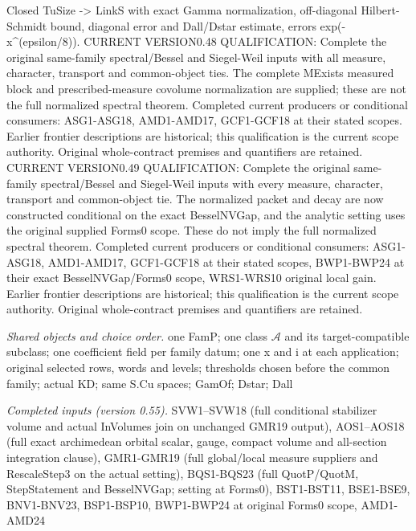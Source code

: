 \documentclass[11pt,a4paper]{article}
\numberwithin{equation}{section}
\theoremstyle{remark}\newtheorem{remark}[theorem]{Remark}
\begin{document}
Closed TuSize -> LinkS with exact Gamma normalization, off-diagonal Hilbert-Schmidt bound, diagonal error and Dall/Dstar estimate, errors exp(-x\textasciicircum{}(epsilon/8)). CURRENT VERSION0.48 QUALIFICATION: Complete the original same-family spectral/Bessel and Siegel-Weil inputs with all measure, character, transport and common-object ties. The complete MExists measured block and prescribed-measure covolume normalization are supplied; these are not the full normalized spectral theorem. Completed current producers or conditional consumers: ASG1-ASG18, AMD1-AMD17, GCF1-GCF18 at their stated scopes. Earlier frontier descriptions are historical; this qualification is the current scope authority. Original whole-contract premises and quantifiers are retained. CURRENT VERSION0.49 QUALIFICATION: Complete the original same-family spectral/Bessel and Siegel-Weil inputs with every measure, character, transport and common-object tie. The normalized packet and decay are now constructed conditional on the exact BesselNVGap, and the analytic setting uses the original supplied Forms0 scope. These do not imply the full normalized spectral theorem. Completed current producers or conditional consumers: ASG1-ASG18, AMD1-AMD17, GCF1-GCF18 at their stated scopes, BWP1-BWP24 at their exact BesselNVGap/Forms0 scope, WRS1-WRS10 original local gain. Earlier frontier descriptions are historical; this qualification is the current scope authority. Original whole-contract premises and quantifiers are retained.

\emph{Shared objects and choice order.} one FamP; one class $\mathcal A$ and its target-compatible subclass; one coefficient field per family datum; one x and i at each application; original selected rows, words and levels; thresholds chosen before the common family; actual KD; same S.Cu spaces; GamOf; Dstar; Dall

\emph{Completed inputs (version 0.55).} SVW1–SVW18 (full conditional stabilizer volume and actual InVolumes join on unchanged GMR19 output), AOS1–AOS18 (full exact archimedean orbital scalar, gauge, compact volume and all-section integration clause), GMR1-GMR19 (full global/local measure suppliers and RescaleStep3 on the actual setting), BQS1-BQS23 (full QuotP/QuotM, StepStatement and BesselNVGap; setting at Forms0), BST1-BST11, BSE1-BSE9, BNV1-BNV23, BSP1-BSP10, BWP1-BWP24 at original Forms0 scope, AMD1-AMD24
\end{document}
